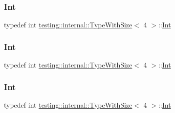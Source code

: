 \subsubsection{\texorpdfstring{Int}{Int}\hspace{0.1cm}{\footnotesize\ttfamily [1/3]}}
{\footnotesize\ttfamily typedef int \mbox{\hyperlink{classtesting_1_1internal_1_1_type_with_size}{testing\+::internal\+::\+Type\+With\+Size}}$<$ 4 $>$\+::\mbox{\hyperlink{classtesting_1_1internal_1_1_type_with_size_3_014_01_4_a80351860c00ed665e73f952143f4484a}{Int}}}

\mbox{\label{classtesting_1_1internal_1_1_type_with_size_3_014_01_4_a80351860c00ed665e73f952143f4484a}} 
\subsubsection{\texorpdfstring{Int}{Int}\hspace{0.1cm}{\footnotesize\ttfamily [2/3]}}
{\footnotesize\ttfamily typedef int \mbox{\hyperlink{classtesting_1_1internal_1_1_type_with_size}{testing\+::internal\+::\+Type\+With\+Size}}$<$ 4 $>$\+::\mbox{\hyperlink{classtesting_1_1internal_1_1_type_with_size_3_014_01_4_a80351860c00ed665e73f952143f4484a}{Int}}}

\mbox{\label{classtesting_1_1internal_1_1_type_with_size_3_014_01_4_a80351860c00ed665e73f952143f4484a}} 
\subsubsection{\texorpdfstring{Int}{Int}\hspace{0.1cm}{\footnotesize\ttfamily [3/3]}}
{\footnotesize\ttfamily typedef int \mbox{\hyperlink{classtesting_1_1internal_1_1_type_with_size}{testing\+::internal\+::\+Type\+With\+Size}}$<$ 4 $>$\+::\mbox{\hyperlink{classtesting_1_1internal_1_1_type_with_size_3_014_01_4_a80351860c00ed665e73f952143f4484a}{Int}}}

